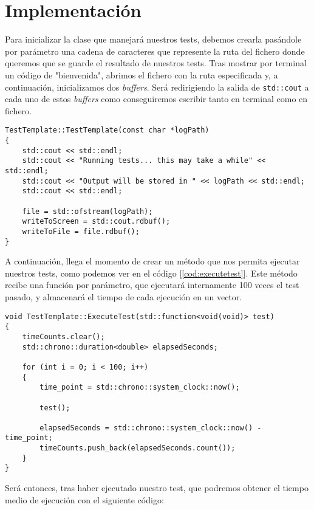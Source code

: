 \section{Implementación}

Para inicializar la clase que manejará nuestros tests, debemos crearla pasándole por parámetro una cadena de caracteres que represente la ruta del fichero donde queremos que se guarde el resultado de nuestros tests. Tras mostrar por terminal un código de "bienvenida", abrimos el fichero con la ruta especificada y, a continuación, inicializamos dos \emph{buffers}. Será redirigiendo la salida de \lstinline{std::cout} a cada uno de estos \emph{buffers} como conseguiremos escribir tanto en terminal como en fichero.

\begin{lstlisting}[style=C-color, caption={Constructor de nuestra clase para manejar tests}, label=cod:testtemplate, escapechar=|]
TestTemplate::TestTemplate(const char *logPath)
{
    std::cout << std::endl;
    std::cout << "Running tests... this may take a while" << std::endl;
    std::cout << "Output will be stored in " << logPath << std::endl;
    std::cout << std::endl;

    file = std::ofstream(logPath);
    writeToScreen = std::cout.rdbuf();
    writeToFile = file.rdbuf();
}
\end{lstlisting}

A continuación, llega el momento de crear un método que nos permita ejecutar nuestros tests, como podemos ver en el código [\ref{cod:executetest}]. Este método recibe una función por parámetro, que ejecutará internamente 100 veces el test pasado,  y almacenará el tiempo de cada ejecución en un vector.

\begin{lstlisting}[style=C-color, caption={Método para ejecutar un test}, label=cod:executetest, escapechar=|]
void TestTemplate::ExecuteTest(std::function<void(void)> test)
{
    timeCounts.clear();
    std::chrono::duration<double> elapsedSeconds;

    for (int i = 0; i < 100; i++)
    {
        time_point = std::chrono::system_clock::now();

        test();

        elapsedSeconds = std::chrono::system_clock::now() - time_point;
        timeCounts.push_back(elapsedSeconds.count());
    }
}
\end{lstlisting}

Será entonces, tras haber ejecutado nuestro test, que podremos obtener el tiempo medio de ejecución con el siguiente código:

